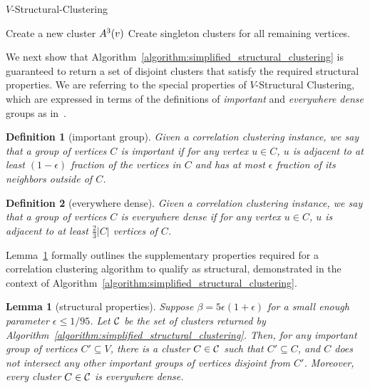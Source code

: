 \documentclass{article}
\newtheorem{lemma}[theorem]{Lemma}
\newtheorem{definition}{Definition}[section]
\begin{document}
\begin{algorithm}[H]
\caption{$V$-Structural-Clustering}
\label{algorithm:simplified_structural_clustering}
\begin{algorithmic}[1]
            \State Create a new cluster $A^3(v)$ \label{alg:cluster_creation}
        \EndIf
    \EndFor
    \State Create singleton clusters for all remaining vertices.
\end{algorithmic}
\end{algorithm}

We next show that Algorithm~\ref{algorithm:simplified_structural_clustering} is guaranteed to return a set of disjoint clusters that satisfy the required structural properties. We are referring to the special properties of $V$-Structural Clustering, which are expressed in terms of the definitions of \textit{important} and \textit{everywhere dense} groups as in~\cite{cohen2022fitting}.

\begin{definition}[important group]
\label{definition:important_group}
Given a correlation clustering instance, we say that
a group of vertices $C$ is important if for any vertex $u\in C$, $u$ is adjacent to at least $(1-\epsilon)$ fraction of the vertices in $C$ and has at most $\epsilon$ fraction of its neighbors outside of $C$.
\end{definition}

\begin{definition}[everywhere dense]
\label{definition:everywhere_dense}
Given a correlation clustering instance, we say that a group of vertices $C$ is everywhere dense if for any vertex $u\in C$, $u$ is adjacent to at least $\frac{2}{3}|C|$ vertices of $C$.
\end{definition}

Lemma~\ref{theorem:structural_properties} formally outlines the supplementary properties required for a correlation clustering algorithm to qualify as structural, demonstrated in the context of Algorithm~\ref{algorithm:simplified_structural_clustering}.

\begin{lemma} [structural properties]
\label{theorem:structural_properties}
    Suppose $\beta = 5\epsilon(1+\epsilon)$ for a small enough parameter $\epsilon \leq 1/95$. Let $\mathcal{C}$ be the set of clusters returned by Algorithm~\ref{algorithm:simplified_structural_clustering}. Then, for any important group of vertices $C' \subseteq V$, there is a cluster $C \in \mathcal{C}$ such that $C' \subseteq C$, and $C$ does not intersect any other important groups of vertices disjoint from $C'$. Moreover, every
    cluster $C \in \mathcal{C}$ is everywhere dense.
\end{lemma}
\end{document}
